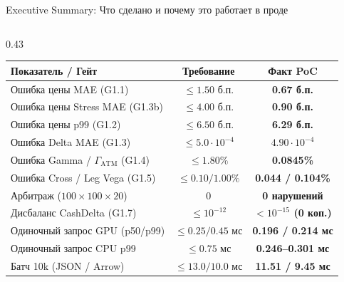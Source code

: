 \documentclass[aspectratio=169, 9pt]{beamer}
\begin{document}
\begin{frame}{Executive Summary: Что сделано и почему это работает в проде}
\begin{columns}[T]
    \begin{column}{0.43\textwidth}
      \begin{table}
        \centering
        \footnotesize
        \renewcommand{\arraystretch}{1.22}
        \begin{tabular}{@{}lcc@{}}
          \toprule
          \textbf{Показатель / Гейт} & \textbf{Требование} & \textbf{Факт PoC} \\
          \midrule
          \rowcolor{sberbg} Ошибка цены MAE (G1.1) & $\le 1.50$ б.п. & \textbf{\color{sberemerald}0.67 б.п.} \\
          Ошибка цены Stress MAE (G1.3b) & $\le 4.00$ б.п. & \textbf{\color{sberemerald}0.90 б.п.} \\
          \rowcolor{sberbg} Ошибка цены p99 (G1.2) & $\le 6.50$ б.п. & \textbf{\color{sberemerald}6.29 б.п.} \\
          Ошибка Delta MAE (G1.3) & $\le 5.0\cdot 10^{-4}$ & \textbf{\color{sberemerald}$4.90\cdot 10^{-4}$} \\
          \rowcolor{sberbg} Ошибка Gamma / $\Gamma_{\text{ATM}}$ (G1.4) & $\le 1.80\%$ & \textbf{\color{sberemerald}0.0845\%} \\
          Ошибка Cross / Leg Vega (G1.5) & $\le 0.10 / 1.00\%$ & \textbf{\color{sberemerald}0.044 / 0.104\%} \\
          \rowcolor{sberbg} Арбитраж ($100\times 100\times 20$) & $0$ & \textbf{\color{sberemerald}0 нарушений} \\
          Дисбаланс CashDelta (G1.7) & $\le 10^{-12}$ & \textbf{\color{sberemerald}$< 10^{-15}$ (0 коп.)} \\
          \rowcolor{sberbg} Одиночный запрос GPU (p50/p99) & $\le 0.25 / 0.45$ мс & \textbf{\color{sberemerald}0.196 / 0.214 мс} \\
          Одиночный запрос CPU p99 & $\le 0.75$ мс & \textbf{\color{sberemerald}0.246--0.301 мс} \\
          \rowcolor{sberbg} Батч 10k (JSON / Arrow) & $\le 13.0 / 10.0$ мс & \textbf{\color{sberemerald}11.51 / 9.45 мс} \\
          \bottomrule
        \end{tabular}
      \end{table}
    \end{column}
  \end{columns}
\end{frame}
\end{document}
